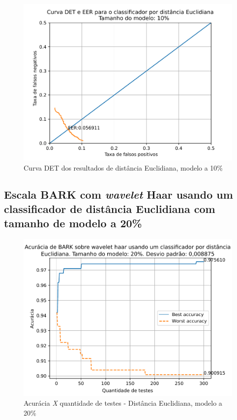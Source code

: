 			\begin{figure}[h]
				\centering
				\includegraphics[width=\linewidth]{images/results/det/DET_for_classifier_Euclidian_10}
				\caption{Curva DET dos resultados de distância Euclidiana, modelo a 10\%}
				\label{fig:detforclassifiereuclidian10}
			\end{figure}
			
			\forceNewPage
		\subsection{Escala BARK com \textit{wavelet} Haar usando um classificador de distância Euclidiana com tamanho de modelo a 20\%}
			
			
			
			\begin{figure}[ht]
				\centering
				\includegraphics[width=\linewidth]{images/results/confusionMatrices/classifier_Euclidian_20}
				\caption{Acurácia \textit{X} quantidade de testes - Distância Euclidiana, modelo a 20\%}
				\label{fig:classifiereuclidian20}
			\end{figure}
		
